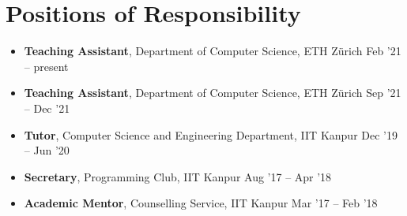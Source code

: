 \newcommand{\por}[3]{\textbf{#1}, #2 \hfill #3}

\section*{Positions of Responsibility}
\begin{itemize}

\setlength\itemsep{0pt}
\item \por{Teaching Assistant}{Department of Computer Science, ETH Zürich}{Feb '21 -- present}%
\item \por{Teaching Assistant}{Department of Computer Science, ETH Zürich}{Sep '21 -- Dec '21}%
\item \por{Tutor}{Computer Science and Engineering Department, IIT Kanpur}{Dec '19 -- Jun '20}%
\item \por{Secretary}{Programming Club, IIT Kanpur}{Aug '17 -- Apr '18}%
\item \por{Academic Mentor}{Counselling Service, IIT Kanpur}{Mar '17 -- Feb '18}%

\end{itemize}
